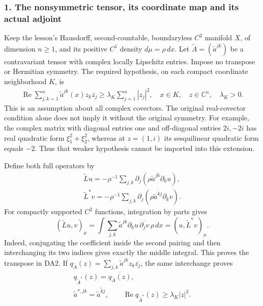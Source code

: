 \documentclass[
  11pt,
]{article}
\begin{document}
\subsubsection{1. The nonsymmetric tensor, its coordinate map and its
actual
adjoint}\label{the-nonsymmetric-tensor-its-coordinate-map-and-its-actual-adjoint}

Keep the lesson's Hausdorff, second-countable, boundaryless \(C^2\)
manifold \(X\), of dimension \(n\geq1\), and its positive \(C^1\)
density \(d\mu=\rho\,dx\). Let \(\widetilde A=(\widetilde a^{jk})\) be a
contravariant tensor with complex locally Lipschitz entries. Impose no
transpose or Hermitian symmetry. The required hypothesis, on each
compact coordinate neighborhood \(K\), is \[
 \begin{gathered}
 \operatorname{Re}\sum_{j,k=1}^n\widetilde a^{jk}(x)z_k\overline{z_j} \geq\lambda_K\sum_{j=1}^n|z_j|^2, \quad x\in K,\quad z\in\mathbb C^n,\quad\lambda_K>0.
 \end{gathered}\tag{DA1}
\] This is an assumption about all complex covectors. The original
real-covector condition alone does not imply it without the original
symmetry. For example, the complex matrix with diagonal entries one and
off-diagonal entries \(2i,-2i\) has real quadratic form
\(\xi_1^2+\xi_2^2\), whereas at \(z=(1,i)\) its sesquilinear quadratic
form equals \(-2\). Thus that weaker hypothesis cannot be imported into
this extension.

Define both full operators by \[
 \begin{gathered}
 \widetilde L u=-\rho^{-1}\sum_{j,k}\partial_j(\rho\widetilde a^{jk}\partial_k u),\\
  \widetilde L^*v=-\rho^{-1}\sum_{j,k}\partial_j(\rho\overline{\widetilde a^{kj}}\partial_k v).
 \end{gathered}\tag{DA2}
\] For compactly supported \(C^2\) functions, integration by parts gives
\[
 (\widetilde L u,v)_\mu
 =\int\sum_{j,k}\widetilde a^{jk}\partial_k u\,\overline{\partial_j v}\,\rho\,dx
 =(u,\widetilde L^*v)_\mu.\tag{DA3}
\] Indeed, conjugating the coefficient inside the second pairing and
then interchanging its two indices gives exactly the middle integral.
This proves the transpose in DA2. If
\(q_{\widetilde A}(z)=\sum_{j,k}\widetilde a^{jk}z_k\overline{z_j}\),
the same interchange proves \[
 \begin{gathered}
 q_{\widetilde A^*}(z)=\overline{q_{\widetilde A}(z)},\\
 \widetilde a^{*,jk}=\overline{\widetilde a^{kj}},
 \qquad\operatorname{Re}q_{\widetilde A^*}(z)\geq\lambda_K|z|^2.
 \end{gathered}\tag{DA4}
\]
\end{document}
